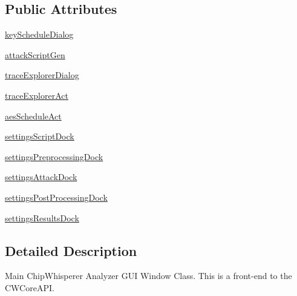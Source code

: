 \subsection*{Public Attributes}
\begin{DoxyCompactItemize}
\item 
\hyperlink{classsoftware_1_1chipwhisperer_1_1analyzer_1_1ui_1_1CWAnalyzerGUI_1_1CWAnalyzerGUI_a75576e80fa111f4c7eec434e53200eaf}{key\+Schedule\+Dialog}
\item 
\hyperlink{classsoftware_1_1chipwhisperer_1_1analyzer_1_1ui_1_1CWAnalyzerGUI_1_1CWAnalyzerGUI_aba6c5849980717cdd10cfdb574d94345}{attack\+Script\+Gen}
\item 
\hyperlink{classsoftware_1_1chipwhisperer_1_1analyzer_1_1ui_1_1CWAnalyzerGUI_1_1CWAnalyzerGUI_a806223047f8a757b4b5972c5cc3592dd}{trace\+Explorer\+Dialog}
\item 
\hyperlink{classsoftware_1_1chipwhisperer_1_1analyzer_1_1ui_1_1CWAnalyzerGUI_1_1CWAnalyzerGUI_a04dd4816db7905dbc338fb2ced731421}{trace\+Explorer\+Act}
\item 
\hyperlink{classsoftware_1_1chipwhisperer_1_1analyzer_1_1ui_1_1CWAnalyzerGUI_1_1CWAnalyzerGUI_ab033f3b0d1d54587c9ebd631b88dad86}{aes\+Schedule\+Act}
\item 
\hyperlink{classsoftware_1_1chipwhisperer_1_1analyzer_1_1ui_1_1CWAnalyzerGUI_1_1CWAnalyzerGUI_aba0c42a6a949323a24e53f2a117bbe98}{settings\+Script\+Dock}
\item 
\hyperlink{classsoftware_1_1chipwhisperer_1_1analyzer_1_1ui_1_1CWAnalyzerGUI_1_1CWAnalyzerGUI_a9352083c6bbe88207a489029a2b614d9}{settings\+Preprocessing\+Dock}
\item 
\hyperlink{classsoftware_1_1chipwhisperer_1_1analyzer_1_1ui_1_1CWAnalyzerGUI_1_1CWAnalyzerGUI_a3d841f2b4bd679cc890cd22d16a6134f}{settings\+Attack\+Dock}
\item 
\hyperlink{classsoftware_1_1chipwhisperer_1_1analyzer_1_1ui_1_1CWAnalyzerGUI_1_1CWAnalyzerGUI_abafaed95fc0382e62470a1880b936fe4}{settings\+Post\+Processing\+Dock}
\item 
\hyperlink{classsoftware_1_1chipwhisperer_1_1analyzer_1_1ui_1_1CWAnalyzerGUI_1_1CWAnalyzerGUI_ac0e58394c0665778738f9dbd30d58a39}{settings\+Results\+Dock}
\end{DoxyCompactItemize}


\subsection{Detailed Description}
\begin{DoxyVerb}Main ChipWhisperer Analyzer GUI Window Class.
This is a front-end to the CWCoreAPI.
\end{DoxyVerb}
 

